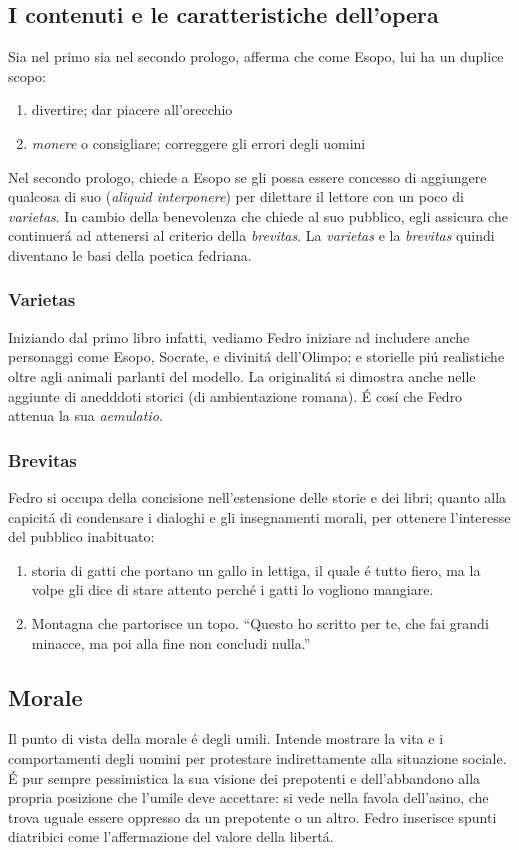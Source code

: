 \documentclass{article}
\begin{document}
\subsection{I contenuti e le caratteristiche dell'opera}
Sia nel primo sia nel secondo prologo, afferma che come Esopo, lui ha un duplice scopo:
\begin{enumerate}
    \item divertire; dar piacere all'orecchio
    \item \emph{monere} o consigliare; correggere gli errori degli uomini
\end{enumerate}
Nel secondo prologo, chiede a Esopo se gli possa essere concesso di aggiungere qualcosa di suo (\emph{aliquid interponere}) per dilettare il lettore con un poco di \emph{varietas}. In cambio della benevolenza che chiede al suo pubblico, egli assicura che continuerá ad attenersi al criterio della \emph{brevitas}. La \emph{varietas} e la \emph{brevitas} quindi diventano le basi della poetica fedriana. 
\subsubsection{Varietas}
Iniziando dal primo libro infatti, vediamo Fedro iniziare ad includere anche personaggi come Esopo, Socrate, e divinitá dell'Olimpo; e storielle piú realistiche oltre agli animali parlanti del modello. La originalitá si dimostra anche nelle aggiunte di anedddoti storici (di ambientazione romana). É cosí che Fedro attenua la sua \emph{aemulatio}.
\subsubsection{Brevitas}
Fedro si occupa della concisione nell'estensione delle storie e dei libri; quanto alla capicitá di condensare i dialoghi e gli insegnamenti morali, per ottenere l'interesse del pubblico inabituato:
\begin{enumerate}
    \item storia di gatti che portano un gallo in lettiga, il quale é tutto fiero, ma la volpe gli dice di stare attento perché i gatti lo vogliono mangiare.
    \item Montagna che partorisce un topo. ``Questo ho scritto per te, che fai grandi minacce, ma poi alla fine non concludi nulla.''
\end{enumerate}
\subsection{Morale}
Il punto di vista della morale é degli umili. Intende mostrare la vita e i comportamenti degli uomini per protestare indirettamente alla situazione sociale.
 É pur sempre pessimistica la sua visione dei prepotenti e dell'abbandono alla propria posizione che l'umile deve accettare: si vede nella favola dell'asino, che trova uguale essere oppresso da un prepotente o un altro. Fedro inserisce spunti diatribici come l'affermazione del valore della libertá.
\end{document}
